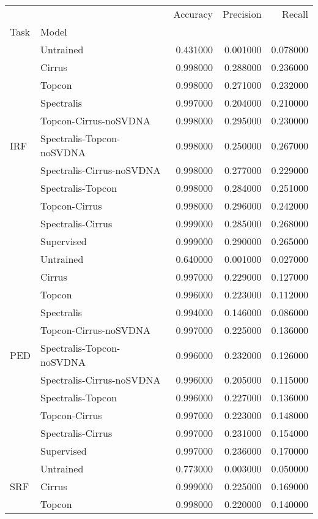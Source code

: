 \begin{tabular}{llrrr}
\toprule
 &  & Accuracy & Precision & Recall \\
Task & Model &  &  &  \\
\midrule
\multirow[t]{11}{*}{IRF} & Untrained & 0.431000 & 0.001000 & 0.078000 \\
 & Cirrus & 0.998000 & 0.288000 & 0.236000 \\
 & Topcon & 0.998000 & 0.271000 & 0.232000 \\
 & Spectralis & 0.997000 & 0.204000 & 0.210000 \\
 & Topcon-Cirrus-noSVDNA & 0.998000 & 0.295000 & 0.230000 \\
 & Spectralis-Topcon-noSVDNA & 0.998000 & 0.250000 & 0.267000 \\
 & Spectralis-Cirrus-noSVDNA & 0.998000 & 0.277000 & 0.229000 \\
 & Spectralis-Topcon & 0.998000 & 0.284000 & 0.251000 \\
 & Topcon-Cirrus & 0.998000 & 0.296000 & 0.242000 \\
 & Spectralis-Cirrus & 0.999000 & 0.285000 & 0.268000 \\
 & Supervised & 0.999000 & 0.290000 & 0.265000 \\
\cline{1-5}
\multirow[t]{11}{*}{PED} & Untrained & 0.640000 & 0.001000 & 0.027000 \\
 & Cirrus & 0.997000 & 0.229000 & 0.127000 \\
 & Topcon & 0.996000 & 0.223000 & 0.112000 \\
 & Spectralis & 0.994000 & 0.146000 & 0.086000 \\
 & Topcon-Cirrus-noSVDNA & 0.997000 & 0.225000 & 0.136000 \\
 & Spectralis-Topcon-noSVDNA & 0.996000 & 0.232000 & 0.126000 \\
 & Spectralis-Cirrus-noSVDNA & 0.996000 & 0.205000 & 0.115000 \\
 & Spectralis-Topcon & 0.996000 & 0.227000 & 0.136000 \\
 & Topcon-Cirrus & 0.997000 & 0.223000 & 0.148000 \\
 & Spectralis-Cirrus & 0.997000 & 0.231000 & 0.154000 \\
 & Supervised & 0.997000 & 0.236000 & 0.170000 \\
\cline{1-5}
\multirow[t]{11}{*}{SRF} 
& Untrained & 0.773000 & 0.003000 & 0.050000 \\
 & Cirrus & 0.999000 & 0.225000 & 0.169000 \\
 & Topcon & 0.998000 & 0.220000 & 0.140000 \\

\end{tabular}
